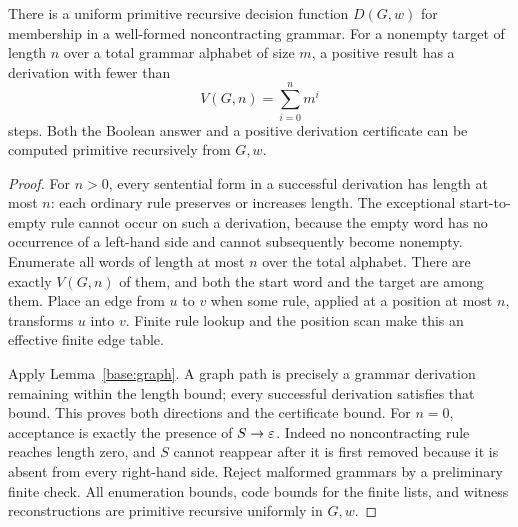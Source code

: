\begin{theorem}\label{eff:noncontracting}
There is a uniform primitive recursive decision function $D(G,w)$ for
membership in a well-formed noncontracting grammar.  For a nonempty target
of length $n$ over a total grammar alphabet of size $m$, a positive result
has a derivation with fewer than
\[
 V(G,n)=\sum_{i=0}^{n}m^i
\]
steps.  Both the Boolean answer and a positive derivation certificate can
be computed primitive recursively from $G,w$.
\end{theorem}
\begin{proof}
For $n>0$, every sentential form in a successful derivation has length at
most $n$: each ordinary rule preserves or increases length.  The exceptional
start-to-empty rule cannot occur on such a derivation, because the empty
word has no occurrence of a left-hand side and cannot subsequently become
nonempty.  Enumerate all words of length at most $n$ over the total
alphabet.  There are exactly $V(G,n)$ of them, and both the start word and
the target are among them.  Place an edge from $u$ to $v$ when some rule,
applied at a position at most $n$, transforms $u$ into $v$.  Finite rule
lookup and the position scan make this an effective finite edge table.

Apply Lemma~\ref{base:graph}.  A graph path is precisely a grammar
derivation remaining within the length bound; every successful derivation
satisfies that bound.  This proves both directions and the certificate
bound.  For $n=0$, acceptance is exactly the presence of $S\to\varepsilon$.
Indeed no noncontracting rule reaches length zero, and $S$ cannot reappear
after it is first removed because it is absent from every right-hand side.
Reject malformed grammars by a preliminary finite check.  All enumeration
bounds, code bounds for the finite lists, and witness reconstructions are
primitive recursive uniformly in $G,w$.
\end{proof}

